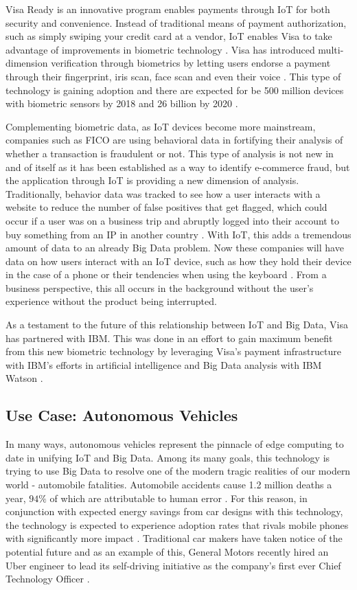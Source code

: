 \documentclass[sigconf]{acmart}
\begin{document}
Visa Ready is an innovative program enables payments through IoT for both security and convenience. Instead of traditional means of payment authorization, such as simply swiping your credit card at a vendor, IoT enables Visa to take advantage of improvements in biometric technology \cite{visa}. Visa has introduced multi-dimension verification through biometrics by letting users endorse a payment through their fingerprint, iris scan, face scan and even their voice \cite{biometric}. This type of technology is gaining adoption and there are expected for be 500 million devices with biometric sensors by 2018 and 26 billion by 2020 \cite{biometricsensors}. 

Complementing biometric data, as IoT devices become more mainstream, companies such as FICO are using behavioral data in fortifying their analysis of whether a transaction is fraudulent or not. This type of analysis is not new in and of itself as it has been established as a way to identify e-commerce fraud, but the application through IoT is providing a new dimension of analysis. Traditionally, behavior data was tracked to see how a user interacts with a website to reduce the number of false positives that get flagged, which could occur if a user was on a business trip and abruptly logged into their account to buy something from an IP in another country \cite{fico}. With IoT, this adds a tremendous amount of data to an already Big Data problem. Now these companies will have data on how users interact with an IoT device, such as how they hold their device in the case of a phone or their tendencies when using the keyboard \cite{biometricuses}. From a business perspective, this all occurs in the background without the user's experience without the product being interrupted. 

As a testament to the future of this relationship between IoT and Big Data, Visa has partnered with IBM. This was done in an effort to gain maximum benefit from this new biometric technology by leveraging Visa's payment infrastructure with IBM's efforts in artificial intelligence and Big Data analysis with IBM Watson \cite{ibmvisa}.

\subsection{Use Case: Autonomous Vehicles}

In many ways, autonomous vehicles represent the pinnacle of edge computing to date in unifying IoT and Big Data. Among its many goals, this technology is trying to use Big Data to resolve one of the modern tragic realities of our modern world - automobile fatalities.  Automobile accidents cause 1.2 million deaths a year, $94\%$ of which are attributable to human error \cite{fatalities}. For this reason, in conjunction with expected energy savings from car designs with this technology, the technology is expected to experience adoption rates that rivals mobile phones with significantly more impact \cite{autonomousimpact}. Traditional car makers have taken notice of the potential future and as an example of this, General Motors recently hired an Uber engineer to lead its self-driving initiative as the company's first ever Chief Technology Officer \cite{gmcto}.
\end{document}
